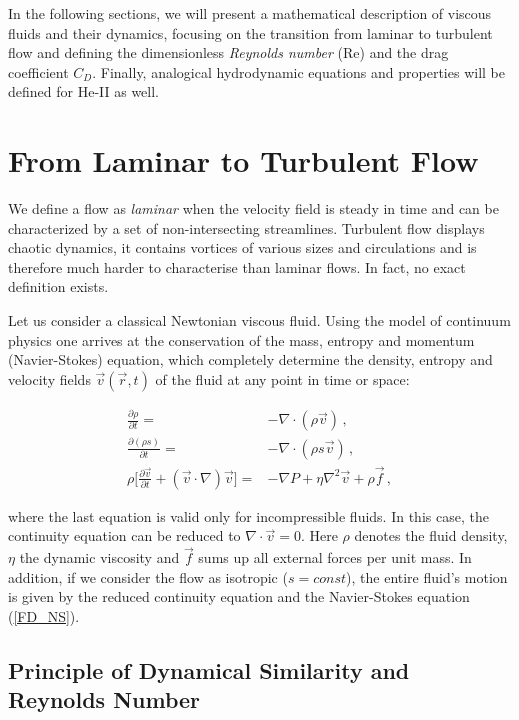 In the following sections, we will present a mathematical description of viscous fluids and their dynamics, focusing on the transition from laminar to turbulent flow and defining the dimensionless \textit{Reynolds number} (Re) and the drag coefficient $ C_D $. Finally, analogical hydrodynamic equations and properties will be defined for He-II as well. 

\newpage

\section{From Laminar to Turbulent Flow}

We define a flow as \textit{laminar} when the velocity field is steady in time and can be characterized by a set of non-intersecting streamlines. Turbulent flow displays chaotic dynamics, it contains vortices of various sizes and circulations and is therefore much harder to characterise than laminar flows. In fact, no exact definition exists.

Let us consider a classical Newtonian viscous fluid. Using the model of continuum physics one arrives\cite{landau} at the conservation of the mass, entropy and momentum (Navier-Stokes) equation, which completely determine the density, entropy and velocity fields $\vec{v}(\vec{r},t)$ of the fluid at any point in time or space:

\begin{align}
\frac{\partial \rho}{\partial t}
=& - \nabla \cdot (\rho\vec{v})\,,
\label{FD_mass}\\
\frac{\partial (\rho s)}{\partial t}
=& - \nabla \cdot (\rho s \vec{v})\,,
\label{FD_entropy}\\
\rho \bigg[ \frac{\partial\vec{v}}{\partial t}
+ (\vec{v}\cdot \nabla)\vec{v} \bigg ]
=& -\nabla P
+ \eta \nabla^2 \vec{v}
+ \rho\vec{f}\,,
\label{FD_NS}
\end{align}

where the last equation is valid only for incompressible fluids. In this case, the continuity equation can be reduced to $ \nabla \cdot \vec{v} = 0 $. Here $\rho$ denotes the fluid density, $\eta$ the dynamic viscosity and $\vec{f}$ sums up all external forces per unit mass. In addition, if we consider the flow as isotropic ($s = \unit{const}$), the entire fluid's motion is given by the reduced continuity equation and the Navier-Stokes equation (\ref{FD_NS}).

\subsection*{Principle of Dynamical Similarity and Reynolds Number}

